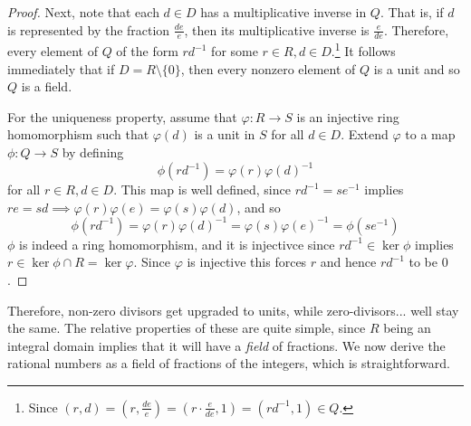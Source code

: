 \begin{proof}
    Next, note that each $d \in D$ has a multiplicative inverse in $Q$. That is, if $d$ is represented by the fraction $\frac{de}{e}$, then its multiplicative inverse is $\frac{e}{de}$. Therefore, every element of $Q$ of the form $r d^{-1}$ for some $r \in R, d \in D$.\footnote{Since $(r, d) = (r, \frac{de}{e}) = (r \cdot \frac{e}{de}, 1) = (r d^{-1}, 1) \in Q$.} It follows immediately that if $D = R \setminus \{0\}$, then every nonzero element of $Q$ is a unit and so $Q$ is a field.  

    For the uniqueness property, assume that $\varphi: R \to S$ is an injective ring homomorphism such that $\varphi(d)$ is a unit in $S$ for all $d \in D$. Extend $\varphi$ to a map $\phi: Q \to S$ by defining 
    \begin{equation}
      \phi(r d^{-1})  = \varphi(r) \varphi(d)^{-1} 
    \end{equation}
    for all $r \in R, d \in D$. This map is well defined, since $r d^{-1} = s e^{-1}$ implies $re = sd \implies \varphi(r) \varphi(e) = \varphi(s) \varphi(d)$, and so 
    \begin{equation}
      \phi(r d^{-1}) = \varphi(r) \varphi(d)^{-1} = \varphi(s) \varphi(e)^{-1} = \phi(s e^{-1})
    \end{equation}
    $\phi$ is indeed a ring homomorphism, and it is injectivce since $rd^{-1} \in \ker{\phi}$ implies $r \in \ker{\phi} \cap R = \ker{\varphi}$. Since $\varphi$ is injective this forces $r$ and hence $rd^{-1}$ to be $0$. 
  \end{proof}

  Therefore, non-zero divisors get upgraded to units, while zero-divisors... well stay the same. The relative properties of these are quite simple, since $R$ being an integral domain implies that it will have a \textit{field} of fractions. We now derive the rational numbers as a field of fractions of the integers, which is straightforward. 

